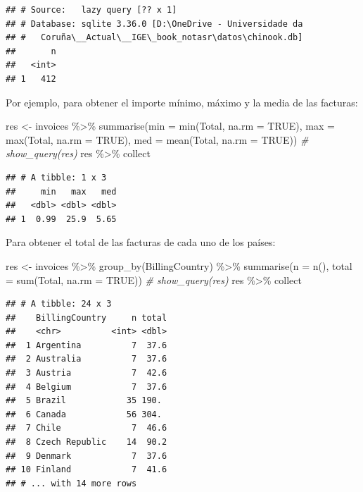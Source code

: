 \documentclass[
]{book}
\newenvironment{Shaded}{\begin{snugshade}}{\end{snugshade}}
\newcommand{\AttributeTok}[1]{\textcolor[rgb]{0.77,0.63,0.00}{#1}}
\newcommand{\CommentTok}[1]{\textcolor[rgb]{0.56,0.35,0.01}{\textit{#1}}}
\newcommand{\ConstantTok}[1]{\textcolor[rgb]{0.00,0.00,0.00}{#1}}
\newcommand{\FunctionTok}[1]{\textcolor[rgb]{0.00,0.00,0.00}{#1}}
\newcommand{\NormalTok}[1]{#1}
\newcommand{\OtherTok}[1]{\textcolor[rgb]{0.56,0.35,0.01}{#1}}
\newcommand{\SpecialCharTok}[1]{\textcolor[rgb]{0.00,0.00,0.00}{#1}}
\theoremstyle{break}
\theoremstyle{nonumberplain}
\begin{document}
\begin{verbatim}
## # Source:   lazy query [?? x 1]
## # Database: sqlite 3.36.0 [D:\OneDrive - Universidade da
## #   Coruña\__Actual\__IGE\_book_notasr\datos\chinook.db]
##       n
##   <int>
## 1   412
\end{verbatim}

Por ejemplo, para obtener el importe mínimo, máximo y la media de las facturas:

\begin{Shaded}
\begin{Highlighting}[]
\NormalTok{res }\OtherTok{\textless{}{-}}\NormalTok{ invoices }\SpecialCharTok{\%\textgreater{}\%} \FunctionTok{summarise}\NormalTok{(}\AttributeTok{min =} \FunctionTok{min}\NormalTok{(Total, }\AttributeTok{na.rm =} \ConstantTok{TRUE}\NormalTok{), }
                        \AttributeTok{max =} \FunctionTok{max}\NormalTok{(Total, }\AttributeTok{na.rm =} \ConstantTok{TRUE}\NormalTok{), }\AttributeTok{med =} \FunctionTok{mean}\NormalTok{(Total, }\AttributeTok{na.rm =} \ConstantTok{TRUE}\NormalTok{))}
\CommentTok{\# show\_query(res)}
\NormalTok{res  }\SpecialCharTok{\%\textgreater{}\%}\NormalTok{ collect}
\end{Highlighting}
\end{Shaded}

\begin{verbatim}
## # A tibble: 1 x 3
##     min   max   med
##   <dbl> <dbl> <dbl>
## 1  0.99  25.9  5.65
\end{verbatim}

Para obtener el total de las facturas de cada uno de los países:

\begin{Shaded}
\begin{Highlighting}[]
\NormalTok{res }\OtherTok{\textless{}{-}}\NormalTok{ invoices }\SpecialCharTok{\%\textgreater{}\%} \FunctionTok{group\_by}\NormalTok{(BillingCountry) }\SpecialCharTok{\%\textgreater{}\%} 
          \FunctionTok{summarise}\NormalTok{(}\AttributeTok{n =} \FunctionTok{n}\NormalTok{(), }\AttributeTok{total =} \FunctionTok{sum}\NormalTok{(Total, }\AttributeTok{na.rm =} \ConstantTok{TRUE}\NormalTok{))}
\CommentTok{\# show\_query(res)}
\NormalTok{res  }\SpecialCharTok{\%\textgreater{}\%}\NormalTok{ collect}
\end{Highlighting}
\end{Shaded}

\begin{verbatim}
## # A tibble: 24 x 3
##    BillingCountry     n total
##    <chr>          <int> <dbl>
##  1 Argentina          7  37.6
##  2 Australia          7  37.6
##  3 Austria            7  42.6
##  4 Belgium            7  37.6
##  5 Brazil            35 190. 
##  6 Canada            56 304. 
##  7 Chile              7  46.6
##  8 Czech Republic    14  90.2
##  9 Denmark            7  37.6
## 10 Finland            7  41.6
## # ... with 14 more rows
\end{verbatim}
\end{document}

